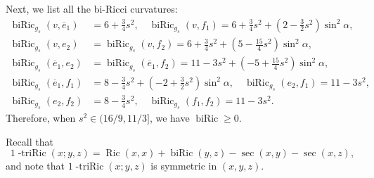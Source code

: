 \documentclass[11pt,letterpaper]{amsart}
\DeclareMathOperator{\Ric}{Ric}
\DeclareMathOperator{\biRic}{biRic}
\newcommand{\ove}{\overline{e}}
\theoremstyle{definition}
\theoremstyle{remark}
\numberwithin{equation}{section}
\begin{document}
Next, we list all the bi-Ricci curvatures:
\begin{equation*}
    \begin{split}
        \biRic_{g_s}(v,\ove_1)&=6+\frac{3}{4}s^2,\quad \biRic_{g_s}(v,f_1)=6+\frac{3}{4}s^2+\left(2-\frac{3}{2}s^2\right)\sin^2 \alpha,\\
        \biRic_{g_s}(v,e_2)&=\biRic_{g_s}(v,f_2)=6+\frac{3}{4}s^2+\left(5-\frac{15}{4}s^2\right)\sin^2 \alpha,\\
        \biRic_{g_s}(\ove_1,e_2)&=\biRic_{g_s}(\ove_1,f_2)=11-3s^2+\left(-5+\frac{15}{4}s^2\right)\sin^2 \alpha,\\
        \biRic_{g_s}(\ove_1,f_1)&=8-\frac{3}{4}s^2+\left(-2+\frac{3}{2}s^2\right)\sin^2 \alpha,\quad \biRic_{g_s}(e_2,f_1)=11-3s^2,\\
        \biRic_{g_s}(e_2,f_2)&=8-\frac{3}{4}s^2,\quad 
         \biRic_{g_s}(f_1,f_2)=11-3s^2.
    \end{split}
\end{equation*}
Therefore, when $s^2\in (16/9,11/3]$, we have $\biRic \geq 0$.



Recall that
\begin{equation*}
        1\operatorname{-triRic}(x;y,z)=\Ric(x,x)+\biRic(y,z)-\sec(x,y)-\sec(x,z),
    \end{equation*}
    and note that $1\operatorname{-triRic}(x;y,z)$ is symmetric in $(x,y,z)$.
\end{document}

